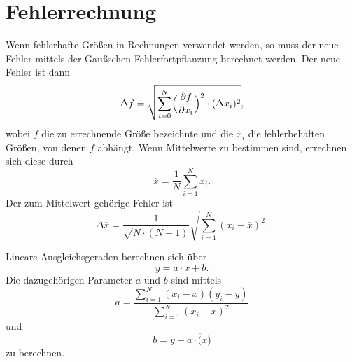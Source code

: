 \section{Fehlerrechnung}
\label{sec:Fehlerrechnung}
Wenn fehlerhafte Größen in Rechnungen verwendet werden, so muss der neue Fehler mittels der Gaußschen Fehlerfortpflanzung berechnet werden. Der neue Fehler ist dann
\begin{equation}
\label{eqt:fehlerfortpflanzung}
\Delta f = \sqrt{\sum_{i=0}^N \Bigl( \frac{\partial f}{\partial x_i} \Bigr) ^2 \cdot (\Delta x_i)^2 },
\end{equation}
wobei $f$ die zu errechnende Größe bezeichnte und die $x_i$ die fehlerbehaften Größen, von denen $f$ abhängt.
Wenn Mittelwerte zu bestimmen sind, errechnen sich diese durch
\begin{equation}
\label{eqt:mittelwert}
\overline{x} = \frac {1} {N} \sum_{i=1}^N x_i.
\end{equation}
Der zum Mittelwert gehörige Fehler ist
\begin{equation}
\label{eqt:FehlerMittelwert}
\Delta \overline{x} = \frac{1}{\sqrt{N \cdot (N-1)}} \sqrt{ \sum_{i=1}^N (x_i - \overline{x})^2}.
\end{equation}

Lineare Ausgleichsgeraden berechnen sich über
\begin{equation}
\label{eqt:Gerade}
y = a \cdot x + b.
\end{equation}
Die dazugehörigen Parameter $a$ und $b$ sind mittels
\begin{equation}
\label{eqt:a}
a = \frac {\sum_{i=1}^N (x_i - \overline{x}) (y_i - \overline{y})}{\sum_{i=1}^N (x_i - \overline{x})^2}
\end{equation}
und
\begin{equation}
\label{eqt:b}
b = \overline{y} - a \cdot \overline(x)
\end{equation}
zu berechnen.